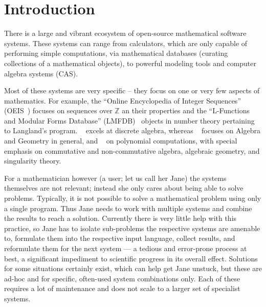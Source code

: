 \section{Introduction}\label{sec:intro}

There is a large and vibrant ecosystem of open-source mathematical software systems. 
These systems can range from calculators, which are only capable of performing simple computations, via mathematical databases (curating collections of a mathematical objects), to powerful modeling tools and computer algebra systems (CAS).

Most of these systems are very specific -- they focus on one or very few aspects of mathematics. 
For example, the ``Online Encyclopedia of Integer Sequences'' (OEIS~\cite{Sloane:oeis12,oeis}) focuses on sequences over $\mathbb{Z}$ an their properties and the ``L-Functions and Modular Forms Database'' (LMFDB)~\cite{Cremona:LMFDB16,lmfdb:on} objects in number theory pertaining to Langland's program. 
\GAP~\cite{GAP:on} excels at discrete algebra, whereas \Sage~\cite{SageMath:on} focuses on Algebra and Geometry in general, and \Singular~\cite{singular:on} on polynomial computations, with special emphasis on commutative and non-commutative algebra, algebraic geometry, and singularity theory.



For a mathematician however (a user; let us call her Jane) the systems themselves are not relevant; instead she only cares about being able to solve problems. 
Typically, it is not possible to solve a mathematical problem using only a single program. 
Thus Jane needs to work with multiple systems and combine the results to reach a solution. 
Currently there is very little help with this practice, so Jane has to isolate sub-problems the respective systems are amenable to, formulate them into the respective input language, collect results, and reformulate them for the next system --- a tedious and error-prone process at best, a significant impediment to scientific progress in its overall effect. 
Solutions for some situations certainly exist, which can help get Jane unstuck, but these are ad-hoc and for specific, often-used system combinations only. 
Each of these requires a lot of maintenance and does not scale to a larger set of specialist systems. 

